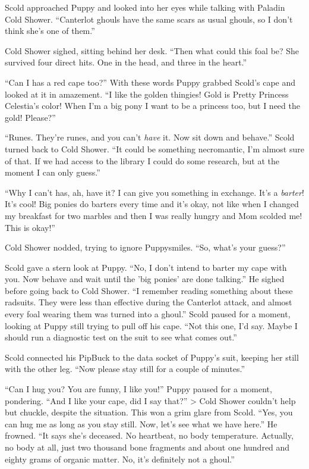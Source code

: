 Scold approached Puppy and looked into her eyes while talking with Paladin Cold Shower. ``Canterlot ghouls have the same scars as usual ghouls, so I don't think she's one of them.''

Cold Shower sighed, sitting behind her desk. ``Then what could this foal be? She survived four direct hits. One in the head, and three in the heart.''

``Can I has a red cape too?'' With these words Puppy grabbed Scold's cape and looked at it in amazement. ``I like the golden thingies! Gold is Pretty Princess Celestia's color! When I'm a big pony I want to be a princess too, but I need the gold! Please?''

``Runes. They're runes, and you can't \emph{have} it. Now sit down and behave.'' Scold turned back to Cold Shower. ``It could be something necromantic, I'm almost sure of that. If we had access to the library I could do some research, but at the moment I can only guess.''

``Why I can't has, ah, have it? I can give you something in exchange. It's a \emph{barter}! It's cool! Big ponies do barters every time and it's okay, not like when I changed my breakfast for two marbles and then I was really hungry and Mom scolded me! This is okay!''

Cold Shower nodded, trying to ignore Puppysmiles. ``So, what's your guess?''

Scold gave a stern look at Puppy. ``No, I don't intend to barter my cape with you. Now behave and wait until the 'big ponies' are done talking.'' He sighed before going back to Cold Shower. ``I remember reading something about these radsuits. They were less than effective during the Canterlot attack, and almost every foal wearing them was turned into a ghoul.'' Scold paused for a moment, looking at Puppy still trying to pull off his cape. ``Not this one, I'd say. Maybe I should run a diagnostic test on the suit to see what comes out.''

Scold connected his PipBuck to the data socket of Puppy's suit, keeping her still with the other leg. ``Now please stay still for a couple of minutes.''

``Can I hug you? You are funny, I like you!'' Puppy paused for a moment, pondering. ``And I like your cape, did I say that?''
>
Cold Shower couldn't help but chuckle, despite the situation. This won a grim glare from Scold. ``Yes, you can hug me as long as you stay still. Now, let's see what we have here.'' He frowned. ``It says she's deceased. No heartbeat, no body temperature. Actually, no body at all, just two thousand bone fragments and about one hundred and eighty grams of organic matter. No, it's definitely not a ghoul.''

